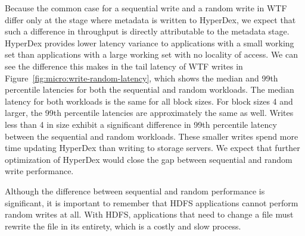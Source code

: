 \documentclass[twocolumn,10pt,letterpaper]{article}
\begin{document}
Because the common case for a sequential write and a random write in WTF differ
only at the stage where metadata is written to HyperDex, we expect that such a
difference in throughput is directly attributable to the metadata stage.
HyperDex provides lower latency variance to applications with a small working
set than applications with a large working set with no locality of access.  We
can see the difference this makes in the tail latency of WTF writes in
Figure~\ref{fig:micro:write-random-latency}, which shows the median and 99th
percentile latencies for both the sequential and random workloads.  The median
latency for both workloads is the same for all block sizes.  For block sizes
\unit{4}{\mega\byte} and larger, the 99th percentile latencies are approximately
the same as well.  Writes less than \unit{4}{\mega\byte} in size exhibit a
significant difference in 99th percentile latency between the sequential and
random workloads.  These smaller writes spend more time updating HyperDex than
writing to storage servers.  We expect that further optimization of HyperDex
would close the gap between sequential and random write performance.

Although the difference between sequential and random performance is
significant, it is important to remember that HDFS applications cannot perform
random writes at all.  With HDFS, applications that need to change a file must
rewrite the file in its entirety, which is a costly and slow process.
\end{document}
